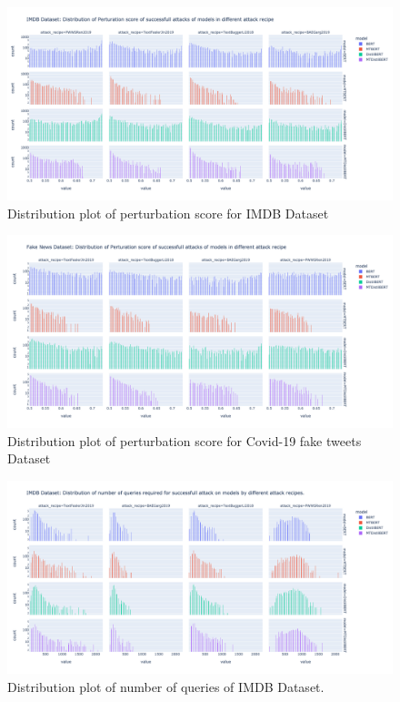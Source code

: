 \documentclass[%
	BCOR=8mm, %
	DIV=12,
	toc=bibliography, %
	toc=listof, %
	oneside, %
	egregdoesnotlikesansseriftitles, %
	]{scrbook}
\begin{document}
\begin{figure}[H]
    \centering
    \includegraphics[width=1.1\linewidth]{img/PertScoreDist_IMDB.png}
    \caption[Distribution plot of perturbation score for IMDB Dataset]{Distribution plot of perturbation score for IMDB Dataset}
    \label{fig:PerturbationScore_Dist_IMDB}
\end{figure}
\begin{figure}[H]
    \centering
    \includegraphics[width=1.1\linewidth]{img/PertScoreDist_fakenews.png}
    \caption[Distribution plot of perturbation score for Covid-19 fake tweets Dataset]{Distribution plot of perturbation score for Covid-19 fake tweets Dataset}
    \label{fig:PerturbationScore_Dist_fakenews}
\end{figure}
\begin{figure}[H]
    \centering
    \includegraphics[width=1.1\linewidth]{img/NumQueriesDist_IMDB.png}
    \caption[Distribution plot of number of queries of IMDB Dataset]{Distribution plot of number of queries of  IMDB Dataset.}
    \label{fig:Queries_distribution_imdb}
\end{figure}
\end{document}
